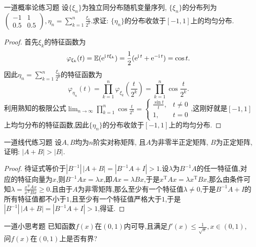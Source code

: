 \documentclass[UTF8,no-math,12pt,openany,table,dvipsnames,svgnames]{book}
\renewcommand{\le}{\leqslant}
\renewcommand{\ge}{\geqslant}
\begin{document}
\begin{MYBOX}[colbacktitle=green]{一道概率论练习题}
设$\{\xi_n\}$为独立同分布随机变量序列, $\{\xi_n\}$的分布列为$\begin{pmatrix}
-1&1\\0.5&0.5
\end{pmatrix},\eta_n=\sum_{k=1}^n\frac{\xi_k}{2^k}$.求证: $\{\eta_n\}$的分布收敛于$[-1,1]$上的均匀分布.
\tcblower
\begin{proof}
首先$\xi_k$的特征函数为
\[\varphi_{\xi_k}(t)=\mathbb E(\mathrm e^{\mathrm i\mskip3mu t\xi_k})=\frac12(\mathrm e^{\mathrm i\mskip3mu t}+\mathrm e^{-\mathrm i\mskip3mu t})=\cos t.\]
因此$\eta_n=\sum_{k=1}^n\frac{\xi_k}{2^k}$的特征函数为
\[\varphi_{\eta_n}(t)=\prod_{k=1}^n\varphi_{\xi_k}\left(\frac{t}{2^k}\right)=\prod_{k=1}^n
\cos\frac{t}{2^k}.\]
利用熟知的极限公式$\lim_{n\to\infty}\prod_{k=1}^n\cos\frac{t}{2^k}=\begin{cases}
\frac{\sin t}t,&t\ne0\\
1,&t=0
\end{cases}$,这刚好就是$[-1,1]$上均匀分布的特征函数,因此$\{\eta_n\}$的分布收敛于$[-1,1]$上的均匀分布.
\end{proof}
\end{MYBOX}
\begin{MYBOX}[colbacktitle=magenta]{一道线代练习题}
设$A,B$均为$n$阶实对称矩阵, 且$A$为非零半正定矩阵, $B$为正定矩阵,证明: $|A+B|>|B|$.
\tcblower
\begin{proof}
待证式等价于$|B^{-1}|\,|A+B|=|B^{-1}A+I|>1$.设$\lambda$为$B^{-1}A$的任一特征值,对应的特征向量为$x$,则$B^{-1}Ax=\lambda x$,即$Ax=\lambda Bx$,于是$x^{\mathrm T}Ax=\lambda x^{\mathrm T}Bx$,那么由条件可知$\lambda=\frac{x^{\mathrm T}Ax}{x^{\mathrm T}Bx}\ge0$.且由于$A$为非零矩阵,那么至少有一个特征值$\lambda\ne0$,于是$B^{-1}A+I$的所有特征值都不小于$1$,且至少有一个特征值严格大于$1$,于是$|B^{-1}|\,|A+B|=|B^{-1}A+I|>1$,得证.
\end{proof}
\end{MYBOX}
\begin{MYBOX}[colbacktitle=blue]{一道小思考题}
已知函数$f(x)$在$(0,1)$内可导,且满足$f'(x)\le \frac1{\sqrt x},x\in(0,1)$,问$f(x)$在$(0,1)$上是否有界?
\end{MYBOX}
\end{document}
